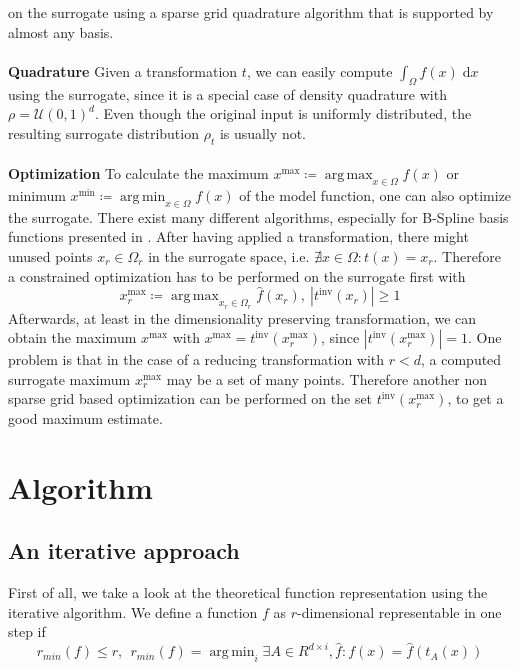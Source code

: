 \documentclass[
  a4paper,  %
  twoside,  %
  bibliography=totoc,
  headsepline,
  cleardoublepage=empty,
  parskip=half,
  draft=false
]{scrbook}
\DeclareMathOperator*{\argmin}{arg\,min}
\DeclareMathOperator*{\argmax}{arg\,max}
\begin{document}
on the surrogate using a sparse grid quadrature algorithm that is supported by almost any basis.
\\
\\
\textbf{Quadrature}
Given a transformation $t$, we can easily compute $\int_{\Omega} f(x) \; \text{d}x$ using the surrogate, since it is a special case of density quadrature with $\rho=\mathcal{U}(0,1)^d$.
Even though the original input is uniformly distributed, the resulting surrogate distribution $\rho_t$ is usually not.
\\
\\
\textbf{Optimization}
To calculate the maximum $x^\text{max} \coloneqq \argmax_{x \in \Omega} f(x)$ or minimum $x^\text{min} \coloneqq \argmin_{x \in \Omega} f(x)$ of the model function, one can also optimize the surrogate. There exist many different algorithms, especially for B-Spline basis functions presented in \cite{}.
After having applied a transformation, there might unused points $x_r \in \Omega_r$ in the surrogate space, i.e. $\nexists x \in \Omega \colon t(x)=x_r$.
Therefore a constrained optimization has to be performed on the surrogate first with
\begin{equation}
x_{r}^\text{max} \coloneqq \argmax_{x_r \in \Omega_r} \hat{f}(x_r), ~ |t^{\text{inv}}(x_{r})|\geq 1
\end{equation}
Afterwards, at least in the dimensionality preserving transformation, we can obtain the maximum $x^\text{max}$ with $x^\text{max}=t^{\text{inv}}(x_{r}^\text{max})$, since $|t^{\text{inv}}(x_{r}^\text{max})|=1$.
One problem is that in the case of a reducing transformation with $r<d$, a computed surrogate maximum $x_{r}^\text{max}$ may be a set of many points.
Therefore another non sparse grid based optimization can be performed on the set $t^{\text{inv}}(x_{r}^\text{max})$, to get a good maximum estimate.

\chapter{Algorithm}

\section{An iterative approach}

First of all, we take a look at the theoretical function representation using the iterative algorithm.
We define a function $f$ as $r$-dimensional representable in one step if
\begin{equation}
r_{min}(f) \leq r, ~~r_{min}(f)=\argmin_i \exists A \in R^{d \times i},\hat{f} \colon f(x)=\hat{f}(t_{A}(x))
\end{equation}
\end{document}
